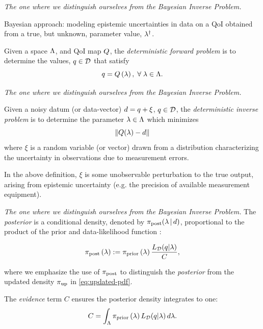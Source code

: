 \begin{frame}[t]{\it The one where we distinguish ourselves from the Bayesian Inverse Problem.}

Bayesian approach: modeling epistemic uncertainties in data on a QoI obtained from a true, but unknown, parameter value, $\lambda^\dagger$.

\vskip 10pt

\begin{defn}
  Given a space ${\Lambda}$, and QoI map $Q$, the \emph{deterministic forward problem} is to determine the values, $q \in \mathcal{D}$ that satisfy
  \begin{equation}
    q = Q\left ( \lambda \right ), \; \forall \; \lambda \in {\Lambda}.
  \end{equation}
\end{defn}


\end{frame}


\begin{frame}[t]{\it The one where we distinguish ourselves from the Bayesian Inverse Problem.}
\begin{defn}
  Given a noisy datum (or data-vector) $d = q + \xi$, $q \in \mathcal{D}$, the \emph{deterministic inverse problem} is to determine the parameter $\lambda \in {\Lambda}$ which minimizes
  \begin{equation}
    \left\Vert Q(\lambda) - d\right\Vert
  \end{equation}
  where $\xi$ is a random variable (or vector) drawn from a distribution characterizing the uncertainty in observations due to measurement errors.
\end{defn}

In the above definition, $\xi$ is some unobservable perturbation to the true output, arising from epistemic uncertainty (e.g. the precision of available measurement equipment).

\end{frame}


\begin{frame}[t]{\it The one where we distinguish ourselves from the Bayesian Inverse Problem.}
The \emph{posterior} is a conditional density, denoted by $\pi_\text{post}(\lambda\, | \, d)$, proportional to the product of the prior and data-likelihood function \cite{Walpole, Berger, Complete, Smith}:

\begin{equation}\label{eq:sb_post}
    \operatorname*{\pi_{post}}\left ( \lambda \right ) := \operatorname*{\pi_{prior}}\left ( \lambda \right ) \frac{L_{\mathcal{D}} (q | \lambda)}{ C },
\end{equation}

\noindent where we emphasize the use of $\operatorname*{\pi_{post}}$ to distinguish the \emph{posterior} from the updated density $\operatorname*{\pi_{up}}$ in \eqref{eq:updated-pdf}.
\bigskip

The \emph{evidence} term $C$ ensures the posterior density integrates to one:
\[
C = \int_{\Lambda} \operatorname*{\pi_{prior}}\left ( \lambda \right ) L_{\mathcal{D}}(q | \lambda) \, d\lambda.
\]

\end{frame}


